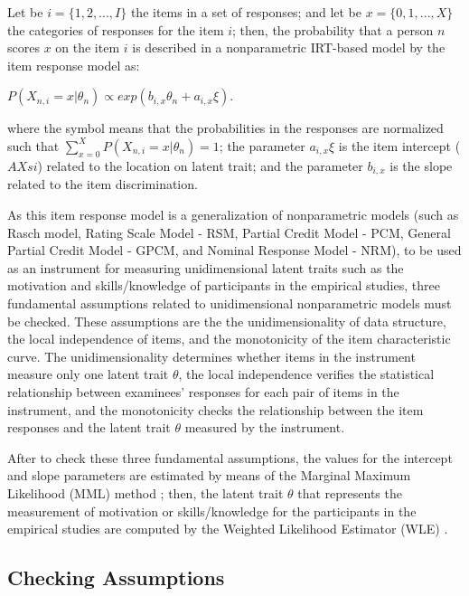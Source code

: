 Let be $i = \{1,2, ..., I\}$ the items in a set of responses; and let be $x = \{0,1, ..., X\}$ the categories of responses for the item $i$; then, the probability that a person $n$ scores $x$ on the item $i$ is described in a nonparametric IRT-based model by the item response model \cite{AdamsWu2007, AdamsWilsonWu1997} as:

$P(X_{n,i} = x | \theta_{n}) \propto exp(b_{i,x} \theta_{n} + a_{i,x} \xi)$.

where the symbol \aspas{$\propto$} means that the probabilities in the responses are normalized such that $\sum_{x=0}^{X} P(X_{n,i} = x | \theta_{n}) = 1$; the parameter $a_{i,x} \xi$ is the item intercept ($AXsi$) related to the location on latent trait; and the parameter $b_{i,x}$ is the slope related to the item discrimination.

As this item response model is a generalization of nonparametric models (such as Rasch model, Rating Scale Model - RSM, Partial Credit Model - PCM, General Partial Credit Model - GPCM, and Nominal Response Model - NRM), to be used as an instrument for measuring unidimensional latent traits such as the motivation and skills/knowledge of participants in the empirical studies, three fundamental assumptions related to unidimensional nonparametric models must be checked. These assumptions are the the unidimensionality of data structure, the local independence of items, and the monotonicity of the item characteristic curve. The unidimensionality determines whether items in the instrument measure only one latent trait $\theta$, the local independence verifies the statistical relationship between examinees’ responses for each pair of items in the instrument, and the monotonicity checks the relationship between the item responses and the latent trait $\theta$ measured by the instrument.

After to check these three fundamental assumptions, the values for the intercept and slope parameters are estimated by means of the Marginal Maximum Likelihood (MML) method \cite{BockAitkin1981}; then, the latent trait $\theta$ that represents the measurement of motivation or skills/knowledge for the participants in the empirical studies are computed by the Weighted Likelihood Estimator (WLE) \cite{Warm1989}. 

\subsection{Checking Assumptions}
\label{sec:checking-assumptions-irt-motivation}

